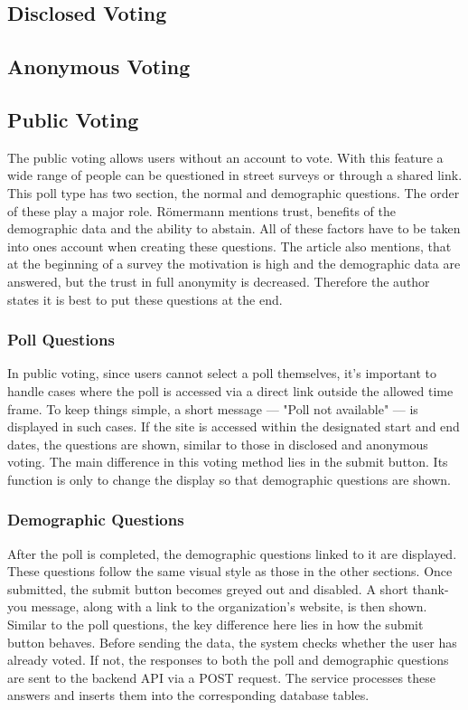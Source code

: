 \documentclass[a4paper,12pt]{report}
\begin{document}
\subsection{Disclosed Voting}
\subsection{Anonymous Voting}
\subsection{Public Voting}
The public voting allows users without an account to vote. With this feature a wide range of people can be questioned in street surveys or through a shared link. This poll type has two section, the normal and demographic questions. The order of these play a major role. Römermann mentions trust, benefits of the demographic data and the ability to abstain. All of these factors have to be taken into ones account when creating these questions. The article also mentions, that at the beginning of a survey the motivation is high and the demographic data are answered, but the trust in full anonymity is decreased. Therefore the author states it is best to put these questions at the end. \cite{demographicdata}
\subsubsection{Poll Questions}
In public voting, since users cannot select a poll themselves, it's important to handle cases where the poll is accessed via a direct link outside the allowed time frame. To keep things simple, a short message — "Poll not available" — is displayed in such cases. If the site is accessed within the designated start and end dates, the questions are shown, similar to those in disclosed and anonymous voting. The main difference in this voting method lies in the submit button. Its function is only to change the display so that demographic questions are shown.
\subsubsection{Demographic Questions}
After the poll is completed, the demographic questions linked to it are displayed. These questions follow the same visual style as those in the other sections. Once submitted, the submit button becomes greyed out and disabled. A short thank-you message, along with a link to the organization's website, is then shown. Similar to the poll questions, the key difference here lies in how the submit button behaves. Before sending the data, the system checks whether the user has already voted. If not, the responses to both the poll and demographic questions are sent to the backend API via a POST request. The service processes these answers and inserts them into the corresponding database tables.
\end{document}
